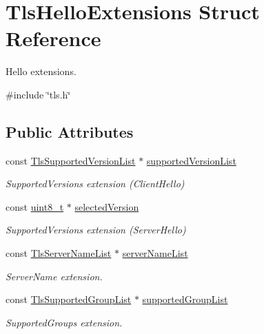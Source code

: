 \hypertarget{structTlsHelloExtensions}{}\section{Tls\+Hello\+Extensions Struct Reference}
\label{structTlsHelloExtensions}


Hello extensions.  




{\ttfamily \#include \char`\"{}tls.\+h\char`\"{}}

\subsection*{Public Attributes}
\begin{DoxyCompactItemize}
\item 
const \hyperlink{tls_8h_a47fa2b51d8550d068fce6f01a24c03a8}{Tls\+Supported\+Version\+List} $\ast$ \hyperlink{structTlsHelloExtensions_ad2c1f8bd3e6432fe17b9ac339fc35a0b}{supported\+Version\+List}
\begin{DoxyCompactList}\small\item\em Supported\+Versions extension (Client\+Hello) \end{DoxyCompactList}\item 
const \hyperlink{stdint_8h_aba7bc1797add20fe3efdf37ced1182c5}{uint8\+\_\+t} $\ast$ \hyperlink{structTlsHelloExtensions_a3fcdd9177ae16d800a0c7de6a6a45786}{selected\+Version}
\begin{DoxyCompactList}\small\item\em Supported\+Versions extension (Server\+Hello) \end{DoxyCompactList}\item 
const \hyperlink{tls_8h_a15e86cf6f06b8178e14735d6e4c83cb1}{Tls\+Server\+Name\+List} $\ast$ \hyperlink{structTlsHelloExtensions_a53acaa1dcce86449741ea9a780331d46}{server\+Name\+List}
\begin{DoxyCompactList}\small\item\em Server\+Name extension. \end{DoxyCompactList}\item 
const \hyperlink{tls_8h_a697f1e9ded788afc0e198e055676b13c}{Tls\+Supported\+Group\+List} $\ast$ \hyperlink{structTlsHelloExtensions_ae47ac6a93d2836418dc163d299e46cf7}{supported\+Group\+List}
\begin{DoxyCompactList}\small\item\em Supported\+Groups extension. \end{DoxyCompactList}\item 

\end{DoxyCompactItemize}
